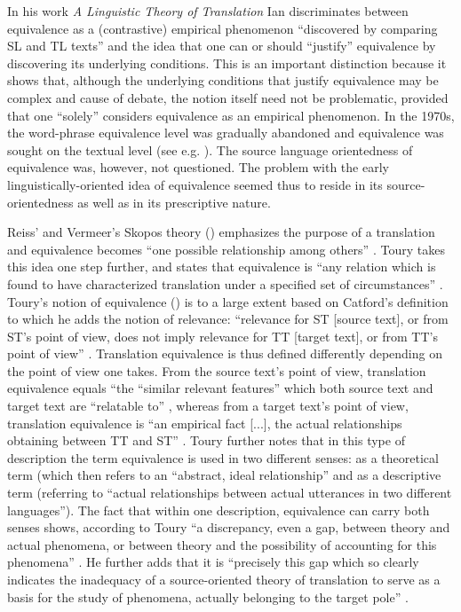 In his work \textit{A Linguistic Theory of Translation} Ian \citet{catford_linguistic_1965} discriminates between equivalence as a (contrastive) empirical phenomenon “discovered by comparing SL and TL texts” \citep[27]{catford_linguistic_1965} and the idea that one can or should ``justify'' equivalence by discovering its underlying conditions. This is an important distinction because it shows that, although the underlying conditions that justify equivalence may be complex and cause of debate, the notion itself need not be problematic, provided that one ``solely'' considers equivalence as an empirical phenomenon. In the 1970s, the word-phrase equivalence level was gradually abandoned and equivalence was sought on the textual level (see e.g. \citealt{koller_einfuhrung_1979}). The source language orientedness of equivalence was, however, not questioned. The problem with the early linguistically-oriented idea of equivalence seemed thus to reside in its source-orientedness as well as in its prescriptive nature.

Reiss’ and Vermeer’s Skopos theory (\citeyear{reiss_grundlegung_1991}) emphasizes the purpose of a translation and equivalence becomes “one possible relationship among others” \citep[5]{schaffner_concept_1999}. Toury takes this idea one step further, and states that equivalence is “any relation which is found to have characterized translation under a specified set of circumstances” \citep[61]{toury_descriptive_1995}. Toury’s notion of equivalence (\citeyear[37 ff.]{toury_search_1980}) is to a large extent based on Catford’s definition to which he adds the notion of relevance: “relevance for ST [source text], or from ST’s point of view, does not imply relevance for TT [target text], or from TT’s point of view” \citep[11]{toury_search_1980}. Translation equivalence is thus defined differently depending on the point of view one takes. From the source text’s point of view, translation equivalence equals “the “similar relevant features” which both source text and target text are “relatable to” \citep[38]{toury_search_1980}, whereas from a target text’s point of view, translation equivalence is “an empirical fact [...], the actual relationships obtaining between TT and ST” \citep[39]{toury_search_1980}. Toury further notes that in this type of description the term equivalence is used in two different senses: as a theoretical term (which then refers to an “abstract, ideal relationship” and as a descriptive term (referring to “actual relationships between actual utterances in two different languages”). The fact that within one description, equivalence can carry both senses shows, according to Toury “a discrepancy, even a gap, between theory and actual phenomena, or between theory and the possibility of accounting for this phenomena” \citep[39]{toury_search_1980}. He further adds that it is “precisely this gap which so clearly indicates the inadequacy of a source-oriented theory of translation to serve as a basis for the study of phenomena, actually belonging to the target pole” \citep[39]{toury_search_1980}.

